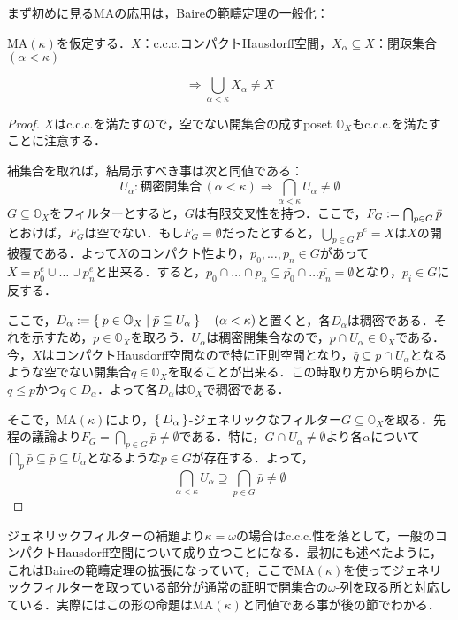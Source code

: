 \documentclass[a4j]{bxjsarticle}
\newcommand{\MA}{\mathrm{MA}}
\theoremstyle{definition}
\begin{document}
まず初めに見るMAの応用は，Baireの範疇定理の一般化：
\begin{lemma}
 $\MA(\kappa)$を仮定する．$X$：c.c.c.コンパクトHausdorff空間，$X_\alpha \subseteq X$：閉疎集合$(\alpha < \kappa)$

  \[
    \Longrightarrow \bigcup_{\alpha < \kappa} X_\alpha \neq X 
  \]
\end{lemma}
\begin{proof}
 $X$はc.c.c.を満たすので，空でない開集合の成すposet $\mathbb{O}_X$もc.c.c.を満たすことに注意する．

 補集合を取れば，結局示すべき事は次と同値である：
 \[
  U_\alpha : \text{稠密開集合}\, (\alpha < \kappa) \Rightarrow \bigcap_{\alpha < \kappa} U_\alpha \neq \emptyset
 \]
 $G \subseteq \mathbb{O}_X$をフィルターとすると，$G$は有限交叉性を持つ．ここで，$F_G \mathrel{:=} \bigcap_{p \in G} \bar{p}$とおけば，$F_G$は空でない．もし$F_G = \emptyset$だったとすると，$\bigcup_{p \in G} p^e = X$は$X$の開被覆である．よって$X$のコンパクト性より，$p_0, \dots, p_n \in G$があって$X = p_0^e \cup \dots \cup p_n^e$と出来る．すると，$p_0 \cap \dots \cap p_n \subseteq \bar{p_0} \cap \dots \bar{p_n} = \emptyset$となり，$p_i \in G$に反する．

 ここで，$D_\alpha \mathrel{:=} \Set{ p \in \mathbb{O}_X | \bar{p} \subseteq U_\alpha } \quad (\alpha < \kappa)$と置くと，各$D_\alpha$は稠密である．それを示すため，$p \in \mathbb{O}_X$を取ろう．$U_\alpha$は稠密開集合なので，$p \cap U_\alpha \in \mathbb{O}_X$である．今，$X$はコンパクトHausdorff空間なので特に正則空間となり，$\bar{q} \subseteq p \cap U_\alpha$となるような空でない開集合$q \in \mathbb{O}_X$を取ることが出来る．この時取り方から明らかに$q \leq p$かつ$q \in D_\alpha$．よって各$D_\alpha$は$\mathbb{O}_X$で稠密である．

 そこで，$\MA(\kappa)$により，$\set{D_\alpha}$-ジェネリックなフィルター$G \subseteq \mathbb{O}_X$を取る．先程の議論より$F_G = \bigcap_{p \in G} \bar{p} \neq \emptyset$である．特に，$G \cap U_\alpha \neq \emptyset$より各$\alpha$について$\bigcap_p \bar{p} \subseteq \bar{p} \subseteq U_\alpha$となるような$p \in G$が存在する．よって，
 \[
  \bigcap_{\alpha < \kappa} U_\alpha \supseteq \bigcap_{p \in G} \bar{p} \neq \emptyset
 \]
 \mbox{}
\end{proof}

ジェネリックフィルターの補題より$\kappa = \omega$の場合はc.c.c.性を落として，一般のコンパクトHausdorff空間について成り立つことになる．最初にも述べたように，これはBaireの範疇定理の拡張になっていて，ここで$\MA(\kappa)$を使ってジェネリックフィルターを取っている部分が通常の証明で開集合の$\omega$-列を取る所と対応している．実際にはこの形の命題は$\MA(\kappa)$と同値である事が後の節でわかる．
\end{document}
